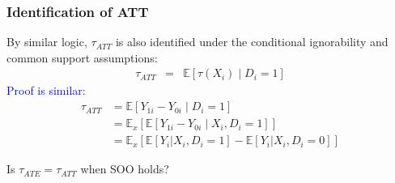 \documentclass[xcolor=dvipsnames]{beamer}
\renewcommand\r{\right}
\renewcommand\l{\left}
\newcommand\E{\mathbb{E}}
\begin{document}
\begin{frame}
\frametitle{Identification of ATT}
\small
{}
By similar logic, $\tau_{ATT}$ is also identified under the conditional ignorability and common support assumptions:
\begin{eqnarray*}
\tau_{ATT} & = & \E[\tau(X_i) \mid D_i=1]
\end{eqnarray*}
\medskip
{} \textcolor{Blue}{Proof is similar:}
\small 
\begin{align*}
\tau_{ATT} &=  \E[Y_{1i} - Y_{0i} \mid D_i=1] \\
	 &= \E_x[\E[Y_{1i} - Y_{0i} \mid X_i, D_i=1]] \\	
	 &= \E_x[\E[Y_{i} | X_i, D_i=1]- \E[Y_i | X_i, D_i=0]]
	 \end{align*}

Is $\tau_{ATE}=\tau_{ATT}$ when SOO holds? %
\end{frame}
%
\end{document}
